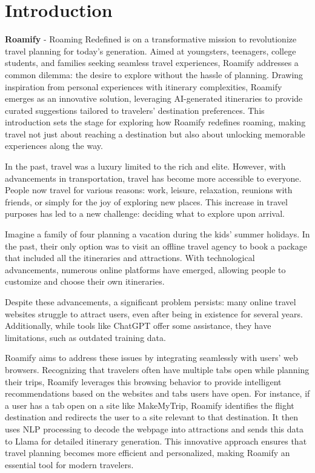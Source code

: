 \documentclass[conference]{IEEEtran}
\begin{document}
\IEEEpeerreviewmaketitle

\section{Introduction}

    \textbf{Roamify} - Roaming Redefined is on a transformative mission to revolutionize travel planning for today's generation. Aimed at youngsters, teenagers, college students, and families seeking seamless travel experiences, Roamify addresses a common dilemma: the desire to explore without the hassle of planning. Drawing inspiration from personal experiences with itinerary complexities, Roamify emerges as an innovative solution, leveraging AI-generated itineraries to provide curated suggestions tailored to travelers' destination preferences. This introduction sets the stage for exploring how Roamify redefines roaming, making travel not just about reaching a destination but also about unlocking memorable experiences along the way.

In the past, travel was a luxury limited to the rich and elite. However, with advancements in transportation, travel has become more accessible to everyone. People now travel for various reasons: work, leisure, relaxation, reunions with friends, or simply for the joy of exploring new places. This increase in travel purposes has led to a new challenge: deciding what to explore upon arrival.

Imagine a family of four planning a vacation during the kids' summer holidays. In the past, their only option was to visit an offline travel agency to book a package that included all the itineraries and attractions. With technological advancements, numerous online platforms have emerged, allowing people to customize and choose their own itineraries.

Despite these advancements, a significant problem persists: many online travel websites struggle to attract users, even after being in existence for several years. Additionally, while tools like ChatGPT offer some assistance, they have limitations, such as outdated training data.

Roamify aims to address these issues by integrating seamlessly with users' web browsers. Recognizing that travelers often have multiple tabs open while planning their trips, Roamify leverages this browsing behavior to provide intelligent recommendations based on the websites and tabs users have open. For instance, if a user has a tab open on a site like MakeMyTrip, Roamify identifies the flight destination and redirects the user to a site relevant to that destination. It then uses NLP processing to decode the webpage into attractions and sends this data to Llama for detailed itinerary generation. This innovative approach ensures that travel planning becomes more efficient and personalized, making Roamify an essential tool for modern travelers.
\end{document}
